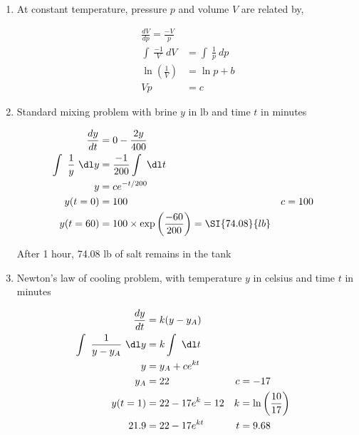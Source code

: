 \begin{enumerate}
    \item At constant temperature, pressure $ p $ and volume $ V $ are related by,

          \begin{align}
              \frac{dV}{dp} = \frac{-V}{p}                           \\
              \int\ \frac{-1}{V}\ dV       & = \int\ \frac{1}{p}\ dp \\
              \ln \left(\frac{1}{V}\right) & = \ln p + b             \\
              Vp                           & = c
          \end{align}


    \item Standard mixing problem with brine $ y $ in lb and time $ t $ in minutes

          \begin{align}
              \frac{dy}{dt}            & = 0 - \frac{2y}{400}                                                        \\
              \int\ \frac{1}{y}\ \dl y & = \frac{-1}{200} \int\ \dl t                                                \\
              y                        & = c e^{-t/200}                                                              \\
              y(t = 0)                 & = 100                                                           & c & = 100 \\
              y(t = 60)                & = 100 \times \exp \left(\frac{-60}{200}\right) = \SI{74.08}{lb}
          \end{align}

          After 1 hour, 74.08 lb of salt remains in the tank

    \item Newton's law of cooling problem, with temperature $ y $ in celsius and time $ t $ in minutes

          \begin{align}
              \frac{dy}{dt}                    & = k(y - y_{A})                                              \\
              \int\ \frac{1}{y - y_{A}}\ \dl y & = k \int\ \dl t                                             \\
              y                                & = y_{A} + c e^{kt}                                          \\
              y_{A}                            & = 22                 & c & = -17                            \\
              y(t = 1)                         & = 22 - 17 e^{k} = 12 & k & = \ln \left(\frac{10}{17}\right) \\
              21.9                             & = 22 - 17e^{kt}      & t & =9.68
          \end{align}


\end{enumerate}
